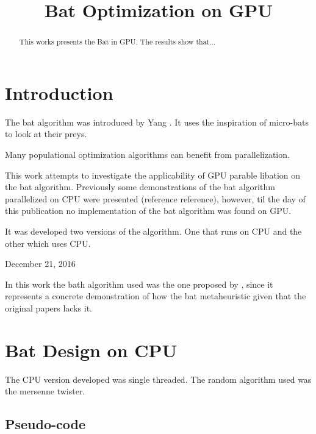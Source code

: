\documentclass[conference]{IEEEtran}
\begin{document}
\title{Bat Optimization on GPU}

\author{
}

\maketitle
\begin{abstract}
    This works presents the Bat in GPU.
    The results show that...
\end{abstract}
\IEEEpeerreviewmaketitle

\section{Introduction}

The bat algorithm was introduced by Yang \cite{original}. It uses the
inspiration of micro-bats to look at their preys.

Many populational optimization algorithms can benefit from
parallelization.

This work attempts to investigate the applicability of GPU parable
libation on the bat algorithm. Previously some demonstrations of the
bat algorithm parallelized on CPU were presented (reference reference),
however, til the day of this publication no implementation of the bat
algorithm was found on GPU.

It was developed two versions of the algorithm. One that runs on CPU and
the other which uses CPU.

\hfill December 21, 2016

In this work the bath algorithm used was the one proposed by
\cite{parpinelli}, since it represents a concrete demonstration of how
the bat metaheuristic given that the original papers lacks it.

\section{Bat Design on CPU}

The CPU version developed was single threaded.
The random algorithm used was the mersenne twister.

\subsection{Pseudo-code}
\end{document}
